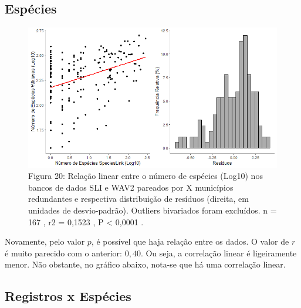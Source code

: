 \subsection{Espécies}

\begin{figure}[h!]
\centering
\includegraphics[width = 12cm]{Imagens/G12.png}
\\{\scriptsize Figura 20: Relação linear entre o número de espécies (Log10) nos bancos de dados SLI e WAV2 pareados por X municípios redundantes e respectiva distribuição de resíduos (direita, em unidades de desvio-padrão). Outliers bivariados foram excluídos. n = 167 , r2 = 0,1523 , P < 0,0001 .}
\end{figure}

\begin{resposta}
Novamente, pelo valor $p$, é possível que haja relação entre os dados. O valor de $r$ é muito parecido com o anterior: $0,40$. Ou seja, a correlação linear é ligeiramente menor. Não obstante, no gráfico abaixo, nota-se que há uma correlação linear. 

\end{resposta}

\subsection {Registros x Espécies}

